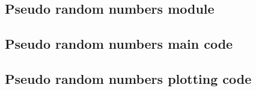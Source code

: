 \documentclass[twocolumn]{myarticle}
\begin{document}
\subsection{Pseudo random numbers module}
\label{subsec:pseudo_random_numbers_module}


\vspace{10pt}

\subsection{Pseudo random numbers main code}
\label{subsec:pseudo_random_numbers_main_code}


\vspace{10pt}

\subsection{Pseudo random numbers plotting code}
\label{subsec:pseudo_random_numbers_plotting_code}


\vspace{10pt}
\end{document}
